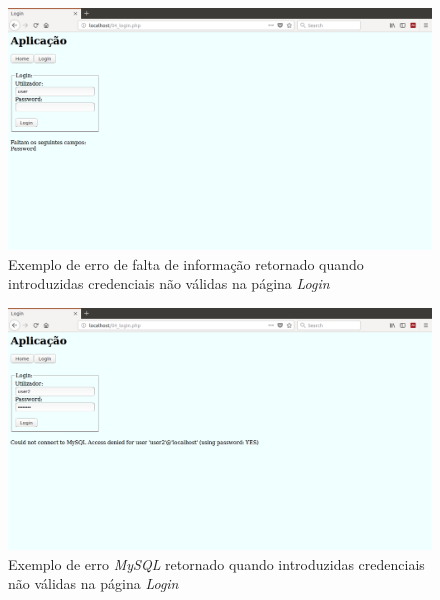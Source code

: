 \documentclass[11pt,twoside,a4paper]{report}
\begin{document}
\begin{figure}[H]
	\begin{center}
		\includegraphics[trim={0 10cm 0 0},clip,width=1\textwidth]{login02} %
		\caption[Exemplo de erro de falta de informação]{Exemplo de erro de falta de informação retornado quando introduzidas credenciais não válidas na página \textit{Login}}
		\label{fig:login2}
	\end{center}
\end{figure}
\begin{figure}[H]
	\begin{center}
		\includegraphics[trim={0 10cm 0 0},clip,width=1\textwidth]{login03} %
		\caption[Exemplo de erro \textit{MySQL}]{Exemplo de erro \textit{MySQL} retornado quando introduzidas credenciais não válidas na página \textit{Login}}
		\label{fig:login3}
	\end{center}
\end{figure}
\end{document}
